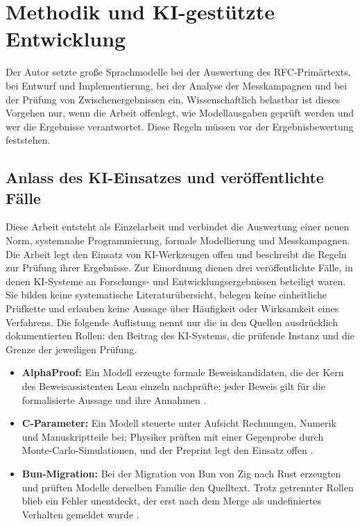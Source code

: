 
\chapter{Methodik und KI-gestützte Entwicklung}
\label{chap:methodik}

Der Autor setzte große Sprachmodelle bei der Auswertung des RFC-Primärtexts, bei Entwurf und Implementierung, bei der
Analyse der Messkampagnen und bei der Prüfung von Zwischenergebnissen ein. Wissenschaftlich belastbar ist dieses
Vorgehen nur, wenn die Arbeit offenlegt, wie Modellausgaben geprüft werden und wer die Ergebnisse verantwortet. Diese
Regeln müssen vor der Ergebnisbewertung feststehen.

\section{Anlass des KI-Einsatzes und veröffentlichte Fälle}
\label{sec:externe-faelle}

Diese Arbeit entsteht als Einzelarbeit und verbindet die Auswertung einer neuen Norm, systemnahe
Programmierung, formale Modellierung und Messkampagnen. Die Arbeit legt den Einsatz von KI-Werkzeugen offen
und beschreibt die Regeln zur Prüfung ihrer Ergebnisse. Zur Einordnung dienen drei
veröffentlichte Fälle, in denen KI-Systeme an Forschungs- und
Entwicklungsergebnissen beteiligt waren. Sie bilden keine systematische Literaturübersicht, belegen keine
einheitliche Prüfkette und erlauben keine Aussage über Häufigkeit oder Wirksamkeit eines Verfahrens. Die
folgende Auflistung nennt nur die in den Quellen ausdrücklich dokumentierten Rollen: den Beitrag des
KI-Systems, die prüfende Instanz und die Grenze der jeweiligen Prüfung.

\begin{itemize}
  \item \textbf{AlphaProof:} Ein Modell erzeugte formale Beweiskandidaten, die der Kern des
    Beweisassistenten Lean einzeln nachprüfte; jeder Beweis gilt für die formalisierte Aussage und ihre
    Annahmen \cite{alphaproof2026}.
  \item \textbf{C-Parameter:} Ein Modell steuerte unter Aufsicht Rechnungen, Numerik und Manuskriptteile
    bei; Physiker prüften mit einer Gegenprobe durch Monte-Carlo-Simulationen, und der Preprint legt den
    Einsatz offen \cite{schwartz2026cparameter}.
  \item \textbf{Bun-Migration:} Bei der Migration von Bun von Zig nach Rust erzeugten und prüften Modelle
    derselben Familie den Quelltext. Trotz getrennter Rollen blieb ein Fehler unentdeckt, der erst nach
    dem Merge als undefiniertes Verhalten gemeldet wurde \cite{bun-in-rust,bun-pr30412,bun-issue30719}.
\end{itemize}

